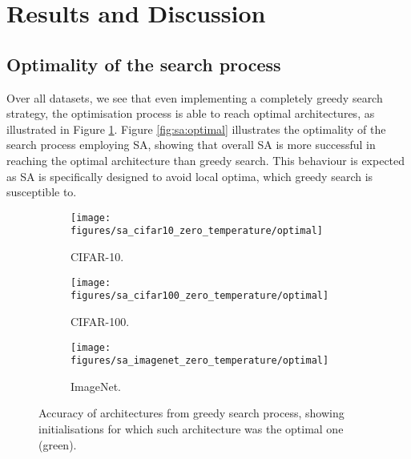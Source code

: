 \documentclass{article}
\begin{document}
\section{Results and Discussion}


\subsection{Optimality of the search process}
Over all datasets, we see that even implementing a completely
greedy search strategy, the optimisation process is able to reach
optimal architectures, as illustrated in
Figure \ref{fig:greedy:optimal}.
Figure \ref{fig:sa:optimal} illustrates the optimality of the search
process employing SA, showing that overall SA is more successful in
reaching the optimal architecture than greedy search.
This behaviour is expected as SA is specifically designed to avoid
local optima, which greedy search is susceptible to.

\begin{figure}[hp]
    \begin{subfigure}[b]{0.9\textwidth}
        \centering
        \texttt{[image: figures/sa\_cifar10\_zero\_temperature/optimal]}
        \caption{CIFAR-10.}
    \end{subfigure}
    \hfill
    \begin{subfigure}[b]{0.9\textwidth}
        \centering
        \texttt{[image: figures/sa\_cifar100\_zero\_temperature/optimal]}
        \caption{CIFAR-100.}
    \end{subfigure}
    \hfill
    \begin{subfigure}[b]{0.9\textwidth}
        \centering
        \texttt{[image: figures/sa\_imagenet\_zero\_temperature/optimal]}
        \caption{ImageNet.}
    \end{subfigure}
    \caption{
        Accuracy of architectures from greedy search process,
        showing initialisations for which such architecture was
        the optimal one (green).
    }
    \label{fig:greedy:optimal}
\end{figure}
\end{document}

